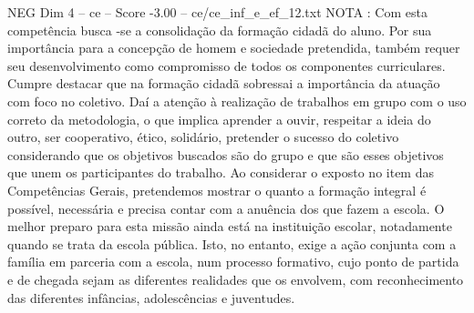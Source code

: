 \begin{textsample}{NEG Dim 4 – ce – Score -3.00 – ce/ce\_inf\_e\_ef\_12.txt}
NOTA : Com esta competência busca -se a consolidação da formação cidadã do aluno.
Por sua importância para a concepção de homem e sociedade pretendida, também requer seu desenvolvimento como compromisso de todos os componentes curriculares.
Cumpre destacar que na formação cidadã sobressai a importância da atuação com foco no coletivo.
Daí a atenção à realização de trabalhos em grupo com o uso correto da metodologia, o que implica aprender a ouvir, respeitar a ideia do outro, ser cooperativo, ético, solidário, pretender o sucesso do coletivo considerando que os objetivos buscados são do grupo e que são esses objetivos que unem os participantes do trabalho.
Ao considerar o exposto no item das Competências Gerais, pretendemos mostrar o quanto a formação integral é possível, necessária e precisa contar com a anuência dos que fazem a escola.
O melhor preparo para esta missão ainda está na instituição escolar, notadamente quando se trata da escola pública.
Isto, no entanto, exige a ação conjunta com a família em parceria com a escola, num processo formativo, cujo ponto de partida e de chegada sejam as diferentes realidades que os envolvem, com reconhecimento das diferentes infâncias, adolescências e juventudes.

\end{textsample}
